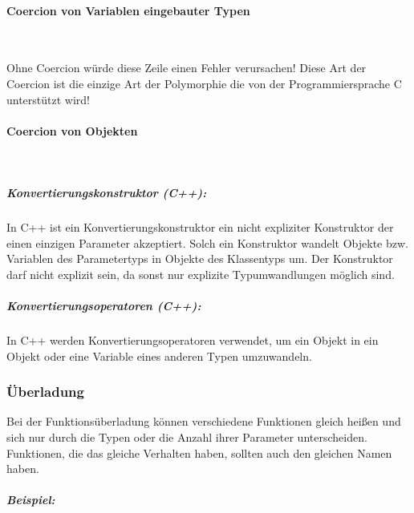 			\paragraph{Coercion von Variablen eingebauter Typen}\mbox{}\\
			
				\UseRawInputEncoding{}
				
				Ohne Coercion würde diese Zeile einen Fehler verursachen! Diese Art der Coercion ist die einzige Art der
				Polymorphie die von der Programmiersprache C unterstützt wird!
			
			\paragraph{Coercion von Objekten}\mbox{}\\
				\subparagraph*{Konvertierungskonstruktor (C++):}
					In C++ ist ein Konvertierungskonstruktor ein nicht expliziter Konstruktor der einen einzigen Parameter
					akzeptiert. Solch ein Konstruktor wandelt Objekte bzw. Variablen des Parametertyps in Objekte des
					Klassentyps um. Der Konstruktor darf nicht explizit sein, da sonst nur explizite Typumwandlungen möglich
					sind.
					
					
					\UseRawInputEncoding{}
				
				\subparagraph*{Konvertierungsoperatoren (C++):}
					In C++ werden Konvertierungsoperatoren verwendet, um ein Objekt in ein Objekt oder eine Variable eines
					anderen Typen umzuwandeln.
					
					\UseRawInputEncoding{}
		
		\subsubsection{Überladung}
			Bei der Funktionsüberladung können verschiedene Funktionen gleich heißen und sich nur durch die Typen oder die
			Anzahl ihrer Parameter unterscheiden. Funktionen, die das gleiche Verhalten haben, sollten auch den gleichen
			Namen haben.
			
			\subparagraph*{Beispiel:}
				\UseRawInputEncoding{}
		
